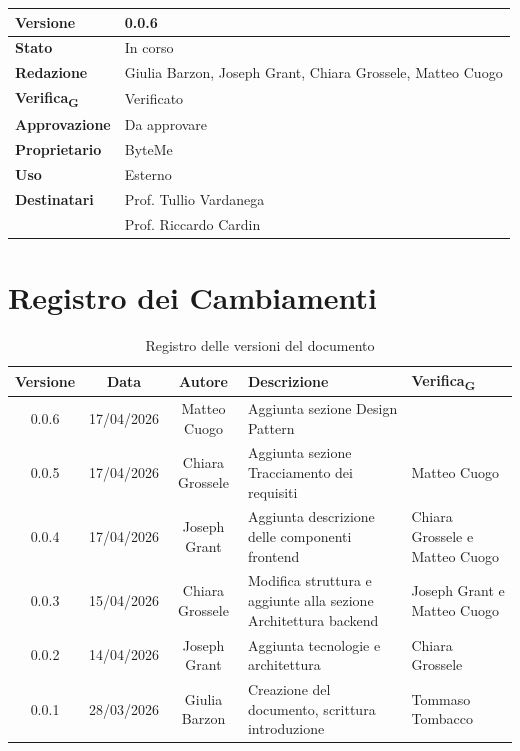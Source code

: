 \documentclass[11pt,a4paper]{article}
\newcommand{\gls}[1]{#1\textsubscript{G}}
\begin{document}
\begin{titlepage}
    \begin{table}[H]
        \centering
        \begin{tabular}{|l|p{5cm}|}
            \hline
            \textbf{Versione} & 0.0.6 \\
            \hline
            \textbf{Stato} & In corso \\
            \hline
            \textbf{Redazione} & Giulia Barzon, Joseph Grant, Chiara Grossele, Matteo Cuogo \\
            \hline
            \textbf{\gls{Verifica}} & Verificato \\
            \hline
            \textbf{Approvazione} & Da approvare\\
            \hline
            \textbf{Proprietario} & ByteMe \\
            \hline
            \textbf{Uso} & Esterno \\
            \hline
            \textbf{Destinatari} & Prof. Tullio Vardanega \\ & Prof. Riccardo Cardin \\
            \hline
        \end{tabular}
    \end{table}
    
    \vfill
\end{titlepage}

\thispagestyle{empty}
\section*{Registro dei Cambiamenti}

\begin{table}[H]
    \centering
    \begin{tabular}{|c|c|c|>{\raggedright\arraybackslash}p{}|p{}|}
        \hline
        \textbf{Versione} & \textbf{Data} & \textbf{Autore} & \textbf{Descrizione} & \textbf{\gls{Verifica}} \\
        \hline
        0.0.6 & 17/04/2026 & Matteo Cuogo & Aggiunta sezione Design Pattern & \\
        \hline
        0.0.5 & 17/04/2026 & Chiara Grossele & Aggiunta sezione Tracciamento dei requisiti & Matteo Cuogo\\
        \hline
        0.0.4 & 17/04/2026 & Joseph Grant & Aggiunta descrizione delle componenti frontend & Chiara Grossele e Matteo Cuogo\\
        \hline
        0.0.3 & 15/04/2026 & Chiara Grossele & Modifica struttura e aggiunte alla sezione Architettura backend& Joseph Grant e Matteo Cuogo\\
        \hline
        0.0.2 & 14/04/2026 & Joseph Grant & Aggiunta tecnologie e architettura & Chiara Grossele\\
        \hline
        0.0.1 & 28/03/2026 & Giulia Barzon & Creazione del documento, scrittura introduzione & Tommaso Tombacco \\
        \hline
    \end{tabular}
    \caption{Registro delle versioni del documento}
    \label{tab:versionamento}
\end{table}
\newpage
\end{document}
